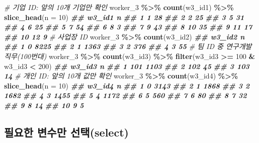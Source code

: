 \documentclass[
]{book}
\newenvironment{Shaded}{\begin{snugshade}}{\end{snugshade}}
\newcommand{\AttributeTok}[1]{\textcolor[rgb]{0.13,0.29,0.53}{#1}}
\newcommand{\CommentTok}[1]{\textcolor[rgb]{0.56,0.35,0.01}{\textit{#1}}}
\newcommand{\DecValTok}[1]{\textcolor[rgb]{0.00,0.00,0.81}{#1}}
\newcommand{\DocumentationTok}[1]{\textcolor[rgb]{0.56,0.35,0.01}{\textbf{\textit{#1}}}}
\newcommand{\FunctionTok}[1]{\textcolor[rgb]{0.13,0.29,0.53}{\textbf{#1}}}
\newcommand{\NormalTok}[1]{#1}
\newcommand{\SpecialCharTok}[1]{\textcolor[rgb]{0.81,0.36,0.00}{\textbf{#1}}}
\begin{document}
\begin{Shaded}
\begin{Highlighting}[]
\CommentTok{\# 기업 ID: 앞의 10개 기업만 확인}
\NormalTok{worker\_3 }\SpecialCharTok{\%\textgreater{}\%} 
  \FunctionTok{count}\NormalTok{(w3\_id1) }\SpecialCharTok{\%\textgreater{}\%} 
  \FunctionTok{slice\_head}\NormalTok{(}\AttributeTok{n =} \DecValTok{10}\NormalTok{)}
\DocumentationTok{\#\#    w3\_id1  n}
\DocumentationTok{\#\# 1       1 28}
\DocumentationTok{\#\# 2       2 25}
\DocumentationTok{\#\# 3       5 31}
\DocumentationTok{\#\# 4       6 25}
\DocumentationTok{\#\# 5       7 54}
\DocumentationTok{\#\# 6       8  3}
\DocumentationTok{\#\# 7       9 43}
\DocumentationTok{\#\# 8      10 35}
\DocumentationTok{\#\# 9      11 17}
\DocumentationTok{\#\# 10     12  9}
\CommentTok{\# 사업장 ID}
\NormalTok{worker\_3 }\SpecialCharTok{\%\textgreater{}\%} 
  \FunctionTok{count}\NormalTok{(w3\_id2)}
\DocumentationTok{\#\#   w3\_id2    n}
\DocumentationTok{\#\# 1      0 8225}
\DocumentationTok{\#\# 2      1 1363}
\DocumentationTok{\#\# 3      2  376}
\DocumentationTok{\#\# 4      3   55}
\CommentTok{\# 팀 ID 중 연구개발 직무(100번대)}
\NormalTok{worker\_3 }\SpecialCharTok{\%\textgreater{}\%} 
  \FunctionTok{count}\NormalTok{(w3\_id3) }\SpecialCharTok{\%\textgreater{}\%} 
  \FunctionTok{filter}\NormalTok{(w3\_id3 }\SpecialCharTok{\textgreater{}=} \DecValTok{100} \SpecialCharTok{\&}\NormalTok{ w3\_id3 }\SpecialCharTok{\textless{}} \DecValTok{200}\NormalTok{)}
\DocumentationTok{\#\#   w3\_id3    n}
\DocumentationTok{\#\# 1    101 1103}
\DocumentationTok{\#\# 2    102   45}
\DocumentationTok{\#\# 3    103   14}
\CommentTok{\# 개인 ID: 앞의 10개 값만 확인}
\NormalTok{worker\_3 }\SpecialCharTok{\%\textgreater{}\%} 
  \FunctionTok{count}\NormalTok{(w3\_id4) }\SpecialCharTok{\%\textgreater{}\%} 
  \FunctionTok{slice\_head}\NormalTok{(}\AttributeTok{n =} \DecValTok{10}\NormalTok{)}
\DocumentationTok{\#\#    w3\_id4    n}
\DocumentationTok{\#\# 1       0 3143}
\DocumentationTok{\#\# 2       1 1868}
\DocumentationTok{\#\# 3       2 1682}
\DocumentationTok{\#\# 4       3 1455}
\DocumentationTok{\#\# 5       4 1172}
\DocumentationTok{\#\# 6       5  560}
\DocumentationTok{\#\# 7       6   80}
\DocumentationTok{\#\# 8       7   32}
\DocumentationTok{\#\# 9       8   14}
\DocumentationTok{\#\# 10      9    5}
\end{Highlighting}
\end{Shaded}

\subsection{필요한 변수만 선택(select)}\label{uxd544uxc694uxd55c-uxbcc0uxc218uxb9cc-uxc120uxd0ddselect}
\end{document}
